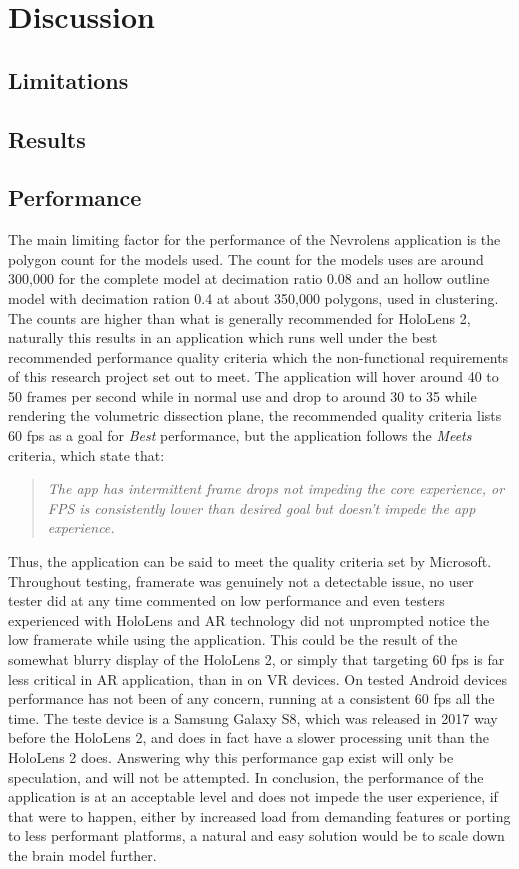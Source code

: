 \chapter{Discussion}

\section{Limitations}

\section{Results}



\section{Performance}\label{chap:discussperformance}

The main limiting factor for the performance of the Nevrolens application is the polygon count for the models used. The count for the models uses are around 300,000 for the complete model at decimation ratio 0.08 and an hollow outline model with decimation ration 0.4 at about 350,000 polygons, used in clustering. The counts are higher than what is generally recommended for HoloLens 2, naturally this results in an application which runs well under the best recommended performance quality criteria which the non-functional requirements of this research project set out to meet. The application will hover around 40 to 50 frames per second while in normal use and drop to around 30 to 35 while rendering the volumetric dissection plane, the recommended quality criteria lists 60 fps as a goal for \textit{Best} performance, but the application follows the \textit{Meets} criteria, which state that:
\begin{quote}
\textit{The app has intermittent frame drops not impeding the core experience, or FPS is consistently lower than desired goal but doesn’t impede the app experience.}
\end{quote}
Thus, the application can be said to meet the quality criteria set by Microsoft. 
Throughout testing, framerate was genuinely not a detectable issue, no user tester did at any time commented on low performance and even testers experienced with HoloLens and AR technology did not unprompted notice the low framerate while using the application. This could be the result of the somewhat blurry display of the HoloLens 2, or simply that targeting 60 fps is far less critical in AR application, than in on VR devices. 
On tested Android devices performance has not been of any concern, running at a consistent 60 fps all the time. The teste device is a Samsung Galaxy S8, which was released in 2017 way before the HoloLens 2, and does in fact have a slower processing unit than the HoloLens 2 does. Answering why this performance gap exist will only be speculation, and will not be attempted.
In conclusion, the performance of the application is at an acceptable level and does not impede the user experience, if that were to happen, either by increased load from demanding features or porting to less performant platforms, a natural and easy solution would be to scale down the brain model further.

